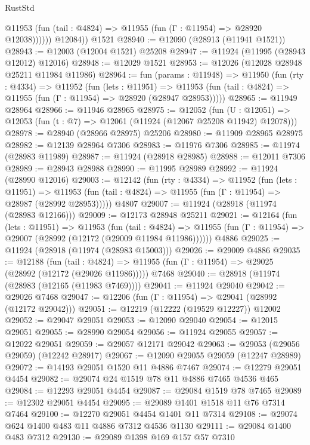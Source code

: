 \begin{lexlean}{RustStd}
\begin{coremodule}
{\begin{coremodule}
{{{{{{{{{{{{{{{{{{{{{{{{{{{{{{{{{{{{{{{{{{{{{{{{{{{{{{{{{{{{{{{{{{{{{{{{{{{{{{{{              @11953 (fun (tail : @4824) => @11955 (fun (Γ : @11954) => @28920 @12038))))))
        @12084))
    @1521
@28940 := @12090 (@28913 (@11941 @1521))
@28943 := @12003 (@12004 @1521) @25208
@28947 := @11924 (@11995 (@28943 @12012) @12016)
@28948 := @12029 @1521
@28953 := @12026 (@12028 @28948 @25211 @11984 @11986)
@28964 := fun (params : @11948) =>
  @11950
    (fun (rty : @4334) =>
    @11952
      (fun (lets : @11951) =>
      @11953 (fun (tail : @4824) => @11955 (fun (Γ : @11954) => @28920 (@28947 @28953)))))
@28965 := @11949 @28964
@28966 := @11946 @28965
@28975 := @12052
    (fun (U : @12051) => @12053 (fun (t : @7) => @12061 (@11924 (@12067 @25208 @11942) @12078)))
@28978 := @28940 (@28966 @28975) @25206
@28980 := @11909 @28965 @28975
@28982 := @12139 @28964 @7306
@28983 := @11976 @7306
@28985 := @11974 (@28983 @11989)
@28987 := @11924 (@28918 @28985)
@28988 := @12011 @7306
@28989 := @28943 @28988
@28990 := @11995 @28989
@28992 := @11924 (@28990 @12016)
@29003 := @12142
    (fun (rty : @4334) =>
    @11952
      (fun (lets : @11951) =>
      @11953 (fun (tail : @4824) => @11955 (fun (Γ : @11954) => @28987 (@28992 @28953)))))
    @4807
@29007 := @11924 (@28918 (@11974 (@28983 @12166)))
@29009 := @12173 @28948 @25211
@29021 := @12164
    (fun (lets : @11951) =>
    @11953
      (fun (tail : @4824) =>
      @11955 (fun (Γ : @11954) => @29007 (@28992 (@12172 (@29009 @11984 @11986))))))
    @4886
@29025 := @11924 (@28918 (@11974 (@28983 @15003)))
@29026 := @29009 @4886
@29035 := @12188
    (fun (tail : @4824) => @11955 (fun (Γ : @11954) => @29025 (@28992 (@12172 (@29026 @11986)))))
    @7468
@29040 := @28918 (@11974 (@28983 (@12165 (@11983 @7469))))
@29041 := @11924 @29040
@29042 := @29026 @7468
@29047 := @12206 (fun (Γ : @11954) => @29041 (@28992 (@12172 @29042)))
@29051 := @12219 (@12222 (@19529 @12227)) @12002
@29052 := @29047 @29051
@29053 := @12090 @29040
@29054 := @12015 @29051
@29055 := @28990 @29054
@29056 := @11924 @29055
@29057 := @12022 @29051
@29059 := @29057 @12171 @29042
@29063 := @29053 (@29056 @29059) (@12242 @28917)
@29067 := @12090 @29055 @29059 (@12247 @28989)
@29072 := @14193 @29051 @1520 @11 @4886 @7467
@29074 := @12279 @29051 @4454
@29082 := @29074 @24 @1519 @78 @11 @4886 @7465 @4536 @465
@29084 := @12293 @29051 @4454
@29087 := @29084 @1519 @78 @7465
@29089 := @12302 @29051 @4454
@29095 := @29089 @1401 @1518 @11 @76 @7314 @7464
@29100 := @12270 @29051 @4454 @1401 @11 @7314
@29108 := @29074 @624 @1400 @483 @11 @4886 @7312 @4536 @1130
@29111 := @29084 @1400 @483 @7312
@29130 := @29089
    @1398
    @169
    @157
    @57
    @7310
}}}}}}}}}}}}}}}}}}}}}}}}}}}}}}}}}}}}}}}}}}}}}}}}}}}}}}}}}}}}}}}}}}}}}}}}}}}}}}}}
\end{coremodule}}
\end{coremodule}
\end{lexlean}
